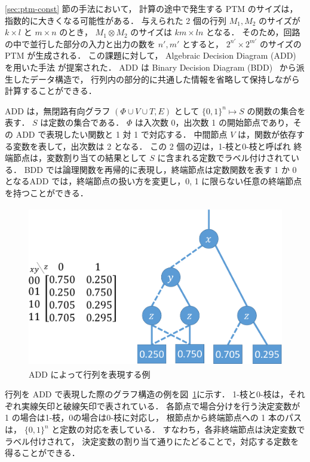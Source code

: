 \ref{sec:ptm-const} 節の手法において，
計算の途中で発生する PTM のサイズは，指数的に大きくなる可能性がある．
与えられた 2 個の行列 $M_{1}, M_{2}$ のサイズが $k \times l$ と $m \times n$ のとき，
$M_{1} \otimes M_{2}$ のサイズは $km \times ln$ となる．
そのため，回路の中で並行した部分の入力と出力の数を $n', m'$ とすると，
$2^{n'} \times 2^{m'}$ のサイズの PTM が生成される．
この課題に対して， Algebraic Decision Diagram (ADD)
\cite{580054} を用いた手法 \cite{Krishnaswamy:2008:PTM:1297666.1297674} が提案された．
ADD は Binary Decision Diagram (BDD)~\cite{BLTJ:BLTJ1585} から派生したデータ構造で，
行列内の部分的に共通した情報を省略して保持しながら計算することができる．

ADD は，無閉路有向グラフ $(\Phi \cup V \cup T, E)$ として
$\{0, 1\}^n \mapsto S$ の関数の集合を表す．
$S$ は定数の集合である．
$\Phi$ は入次数 0，出次数 1 の開始節点であり，その ADD で表現したい関数と 1 対 1 で対応する．
中間節点 $V$ は，関数が依存する変数を表して，出次数は 2 となる．
この 2 個の辺は，1-枝と0-枝と呼ばれ
終端節点は，変数割り当ての結果として $S$ に含まれる定数でラベル付けされている．
BDD では論理関数を再帰的に表現し，終端節点は定数関数を表す 1 か 0 となるADD では，終端節点の扱い方を変更し，0, 1 に限らない任意の終端節点を持つことができる．

\begin{figure}[tb]
  \centering
  \includegraphics[height=70mm]{img/add-sample}
  \caption{ADD によって行列を表現する例}
  \label{fig:ex-add}
\end{figure}
行列を ADD で表現した際のグラフ構造の例を図~\ref{fig:ex-add}に示す．
1-枝と0-枝は，それぞれ実線矢印と破線矢印で表されている．
各節点で場合分けを行う決定変数が 1 の場合は1-枝，0の場合は0-枝に対応し，
根節点から終端節点への 1 本のパスは， $\{0, 1\}^n$ と定数の対応を表している．
すなわち，各非終端節点は決定変数でラベル付けされて，
決定変数の割り当て通りにたどることで，対応する定数を得ることができる．

